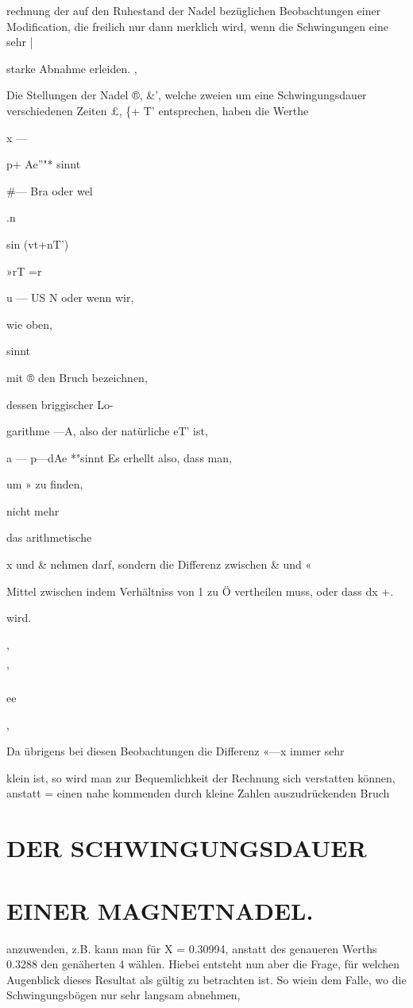 \documentclass[12pt,a4paper]{article}
\begin{document}
rechnung der auf den Ruhestand der Nadel bezüglichen Beobachtungen einer Modification, die freilich nur dann merklich wird, wenn die Schwingungen eine sehr |

starke Abnahme erleiden. ,

Die Stellungen der Nadel ®, \&', welche zweien um eine Schwingungsdauer verschiedenen Zeiten £, \{+ T’ entsprechen, haben die Werthe

x —

p+ Ae”"* sinnt

\#— Bra oder wel

.n

sin (vt+nT')

»rT =r

u — US N oder wenn wir,

wie oben,

sinnt

mit ® den Bruch bezeichnen,

dessen briggischer Lo-

garithme —A, also der natürliche eT' ist,

a — p—dAe *"sinnt Es erhellt also, dass man,

um » zu finden,

nicht mehr

das arithmetische

x und \& nehmen darf, sondern die Differenz zwischen \& und «

Mittel zwischen indem Verhältniss von 1 zu Ö vertheilen muss, oder dass dx +.

wird.

,

’

ee

‚

Da übrigens bei diesen Beobachtungen die Differenz «—x immer sehr

klein ist, so wird man zur Bequemlichkeit der Rechnung sich verstatten können, anstatt = einen nahe kommenden durch kleine Zahlen auszudrückenden Bruch

\section*{DER SCHWINGUNGSDAUER}
\section*{EINER MAGNETNADEL.}
anzuwenden, z.B. kann man für X = 0.30994, anstatt des genaueren Werths 0.3288 den genäherten 4 wählen. Hiebei entsteht nun aber die Frage, für welchen Augenblick dieses Resultat als gültig zu betrachten ist. So wiein dem Falle, wo die Schwingungsbögen nur sehr langsam abnehmen,
\end{document}
